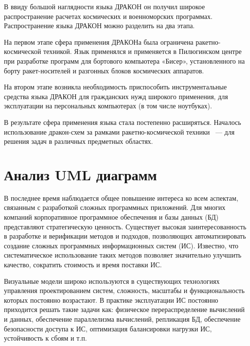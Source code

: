 В ввиду большой наглядности языка ДРАКОН он получил широкое распространение расчетах космических и военноморских программах. Распространение языка ДРАКОН можно разделить на два этапа.

На первом этапе сфера применения ДРАКОНа была ограничена ракетно-космической техникой. Язык применялся и применяется в Пилюгинском центре при разработке программ для бортового компьютера «Бисер», установленного на борту ракет-носителей и разгонных блоков космических аппаратов.

На втором этапе возникла необходимость приспособить инструментальные средства языка ДРАКОН для гражданских нужд широкого применения, для эксплуатации на персональных компьютерах (в том числе ноутбуках).

В результате сфера применения языка стала постепенно расширяться. Началось использование дракон-схем за рамками ракетно-космической техники ~--- для решения задач в различных предметных областях.

\section{Анализ UML диаграмм}

В последнее время наблюдается общее повышение интереса ко всем аспектам, связанным с разработкой сложных программных приложений. Для многих компаний корпоративное программное обеспечения и базы данных (БД) представляют стратегическую ценность. Существует высокая заинтересованность в разработке и верификации методов и подходов, позволяющих автоматизировать создание сложных программных информационных систем (ИС). Известно, что систематическое использование таких методов позволяет значительно улучшить качество, сократить стоимость и время поставки ИС.

Визуальные модели широко используются в существующих технологиях управления проектированием систем, сложность, масштабы и функциональность которых постоянно возрастают. В практике эксплуатации ИС постоянно приходится решать такие задачи как: физическое перераспределение вычислений и данных, обеспечение параллелизма вычислений, репликация БД, обеспечение безопасности доступа к ИС, оптимизация балансировки нагрузки ИС, устойчивость к сбоям и т.п.

